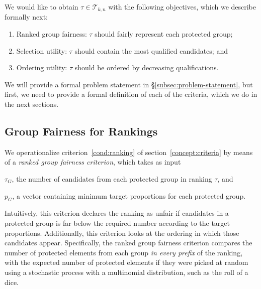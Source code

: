 \label{concept:criteria}
We would like to obtain $\tau \in {\mathcal T}_{k,n}$ with the following objectives, which we describe formally next: %

\begin{enumerate}[{Criterion} 1.]
	\item Ranked group fairness: $\tau$ should fairly represent each protected group; \label{cond:ranking}

	\item Selection utility: $\tau$ should contain the most qualified candidates; and \label{cond:selection}

	\item Ordering utility: $\tau$ should be ordered by decreasing qualifications.\label{cond:ordering}
\end{enumerate}

We will provide a formal problem statement in \S\ref{subsec:problem-statement}, but first, we need to provide a formal definition of each of the criteria, which we do in the next sections.

\subsection{Group Fairness for Rankings}
\label{subsec:group-fairness}

We operationalize criterion~\ref{cond:ranking} of section~\ref{concept:criteria} by means of a \emph{ranked group fairness criterion}, which takes as input
\begin{inparaenum}[(i)]
	\item $ \tau_G $, the number of candidates from each protected group in ranking $ \tau $, and
	\item $ p_G $, a vector containing minimum target proportions for each protected group.
\end{inparaenum}
Intuitively, this criterion declares the ranking as unfair if candidates in a protected group is far below the required number according to the target proportions.
%
Additionally, this criterion looks at the ordering in which those candidates appear.
%
Specifically, the ranked group fairness criterion compares the number of protected elements from each group \emph{in every prefix} of the ranking, with the expected number of protected elements if they were picked at random using a stochastic process with a multinomial distribution, such as the roll of a dice.


